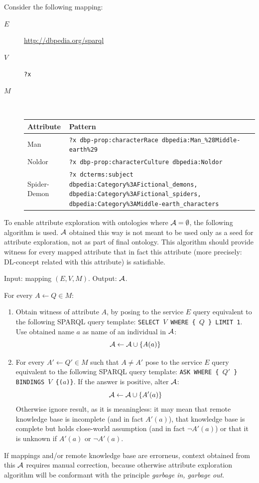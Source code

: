 \documentclass{llncs}
\newcommand{\abox}{\ensuremath\mathcal{A}}
\begin{document}
\begin{example}
Consider the following mapping:
\begin{description}
\item[$E$] \url{http://dbpedia.org/sparql}
\item[$V$] \texttt{?x}
\item[$M$] ~\\ \begin{tabular}{p{}p{}}
Attribute & Pattern \\
\hline
Man & \texttt{?x dbp-prop:characterRace dbpedia:Man\_\%28Middle-earth\%29} \\
Noldor & \texttt{?x dbp-prop:characterCulture dbpedia:Noldor} \\
Spider-Demon & \texttt{?x dcterms:subject dbpedia:Category\%3AFictional\_demons, dbpedia:Category\%3AFictional\_spiders, dbpedia:Category\%3AMiddle-earth\_characters}
\end{tabular}
\end{description}

To enable attribute exploration with ontologies where $\abox=\emptyset$, the
following algorithm is used. $\abox$ obtained this way is not meant to be used
only as a seed for attribute exploration, not as part of final ontology. This
algorithm should provide witness for every mapped attribute that in fact this
attribute (more precisely: DL-concept related with this attribute) is
satisfiable.  
\begin{definition}[Algorithm for population of $\abox$]
Input: mapping $(E,V,M)$. Output: $\abox$.

For every $A\leftarrow Q\in M$:
\begin{enumerate}
\item Obtain witness of attribute $A$, by posing to the service $E$ query equivalent to the following SPARQL query template:
\texttt{SELECT $V$ WHERE \{ $Q$ \} LIMIT 1}. Use obtained name $a$ as name of an individual in $\abox$: 
\[ \abox \leftarrow \abox \cup \{ A(a) \} \]
\item For every $A'\leftarrow Q'\in M$ such that $A\neq A'$ pose to the service $E$ query equivalent to the following SPARQL query template:
\texttt{ASK WHERE \{ $Q'$ \} BINDINGS $V$ \{($a$)\}}. If the answer is positive, alter $\abox$:
\[ \abox \leftarrow \abox \cup \{ A'(a) \} \] Otherwise ignore result, as it
is meaningless: it may mean that remote knowledge base is incomplete (and in
fact $A'(a)$), that knowledge base is complete but holds close-world assumption
(and in fact $\lnot A'(a)$) or that it is unknown if $A'(a)$ or $\lnot A'(a)$.
\end{enumerate}
\end{definition}

If mappings and/or remote knowledge base are errorneus, context obtained from
this $\abox$ requires manual correction, because otherwise attribute
exploration algorithm will be conformant with the principle \emph{garbage in,
garbage out}.

\end{example}
\end{document}
